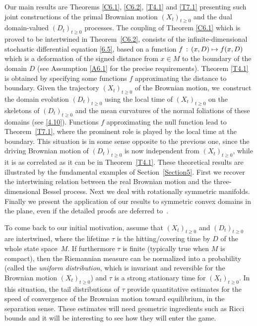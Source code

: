 \documentclass[JEP,XML,SOM,Unicode,NoFloatCountersInSection,published]{cedram}
\newcommand\mto{\mathchoice{\longmapsto}{\mapsto}{\mapsto}{\mapsto}}
\theoremstyle{plain}
\theoremstyle{definition}
\newcommand{\st}{\,:\,}
\begin{document}
Our main results are Theorems \ref{C6.1}, \ref{C6.2}, \ref{T4.1} and \ref{T7.1} presenting such joint constructions of the primal Brownian motion $(X_t)_{t\geq 0}$ and the dual domain-valued $(D_t)_{t\geq 0}$ processes.
The coupling of Theorem \ref{C6.1} which is proved to be intertwined in Theorem~\ref{C6.2}, consists of the infinite-dimensional stochastic differential equation \eqref{6.5}, based on a function $f\st(x,D)\mto f(x,D)$ which is a deformation of the signed distance from $x\in M$ to the boundary of the domain $D$ (see Assumption \eqref{A6.1} for the precise requirements).
Theorem \ref{T4.1} is obtained by specifying some functions $f$ approx\-imating the distance to boundary. Given the trajectory $(X_t)_{t\geq 0}$ of the Brownian motion, we~construct the domain evolution
$(D_t)_{t\geq 0}$ using the local time of $(X_t)_{t\geq 0}$ on the skeletons of $(D_t)_{t\geq 0}$ and the mean curvatures of the normal foliations of these domains (see \eqref{4.10}). Functions $f$ approximating the null function lead to Theorem~\ref{T7.1}, where the prominent role is played by the local time at the boundary.
This situation is in some sense opposite to the previous one, since
the driving Brownian motion of $(D_t)_{t\geq 0}$ is now independent from $(X_t)_{t\geq 0}$, while it is as correlated as it can be in Theorem~\ref{T4.1}.
These theoretical results are illustrated by the fundamental examples of Section~\ref{Section5}. First we recover the intertwining relation between the real Brownian motion and the three-dimensional Bessel process. Next we deal with rota\-tionally symmetric manifolds.
Finally we present the application of our results to symmetric convex domains in the plane, even if the detailed proofs are deferred to~\cite{ACM:21}.
\par
To come back to our initial motivation,
assume that $(X_t)_{t\geq 0}$ and $(D_t)_{t\geq 0}$ are inter\-twined, where the lifetime $\tau$ is the hitting/covering time by $D$ of the whole state space~$M$.
If furthermore $\tau$ is finite (typically true when $M$ is compact), then the Riemannian measure can be normalized into a probability (called the \emph{uniform distribution}, which is invariant and reversible for the Brownian motion $(X_t)_{t\geq 0}$) and $\tau$ is a strong stationary time for $(X_t)_{t\geq 0}$. In this situation, the tail distributions of $\tau$ provide quantitative estimates for the speed of convergence of the Brownian motion toward equilibrium, in the separation sense. These estimates will need geometric ingredients such as Ricci bounds and it will be interesting to see how they will enter the game.
\end{document}
